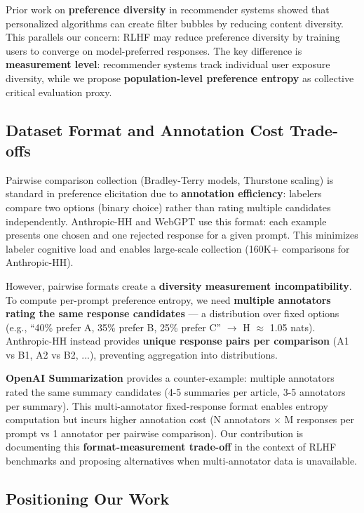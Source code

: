 Prior work on \textbf{preference diversity} in recommender systems \cite{nguyen2014exploring} showed that personalized algorithms can create filter bubbles by reducing content diversity. This parallels our concern: RLHF may reduce preference diversity by training users to converge on model-preferred responses. The key difference is \textbf{measurement level}: recommender systems track individual user exposure diversity, while we propose \textbf{population-level preference entropy} as collective critical evaluation proxy.

\subsection{Dataset Format and Annotation Cost Trade-offs}

Pairwise comparison collection (Bradley-Terry models, Thurstone scaling) is standard in preference elicitation due to \textbf{annotation efficiency}: labelers compare two options (binary choice) rather than rating multiple candidates independently. Anthropic-HH \cite{bai2022constitutional} and WebGPT \cite{nakano2021webgpt} use this format: each example presents one chosen and one rejected response for a given prompt. This minimizes labeler cognitive load and enables large-scale collection (160K+ comparisons for Anthropic-HH).

However, pairwise formats create a \textbf{diversity measurement incompatibility}. To compute per-prompt preference entropy, we need \textbf{multiple annotators rating the same response candidates} — a distribution over fixed options (e.g., ``40\% prefer A, 35\% prefer B, 25\% prefer C'' $\rightarrow$ H $\approx$ 1.05 nats). Anthropic-HH instead provides \textbf{unique response pairs per comparison} (A1 vs B1, A2 vs B2, ...), preventing aggregation into distributions.

\textbf{OpenAI Summarization} \cite{stiennon2020summarize} provides a counter-example: multiple annotators rated the same summary candidates (4-5 summaries per article, 3-5 annotators per summary). This multi-annotator fixed-response format enables entropy computation but incurs higher annotation cost (N annotators $\times$ M responses per prompt vs 1 annotator per pairwise comparison). Our contribution is documenting this \textbf{format-measurement trade-off} in the context of RLHF benchmarks and proposing alternatives when multi-annotator data is unavailable.

\subsection{Positioning Our Work}

